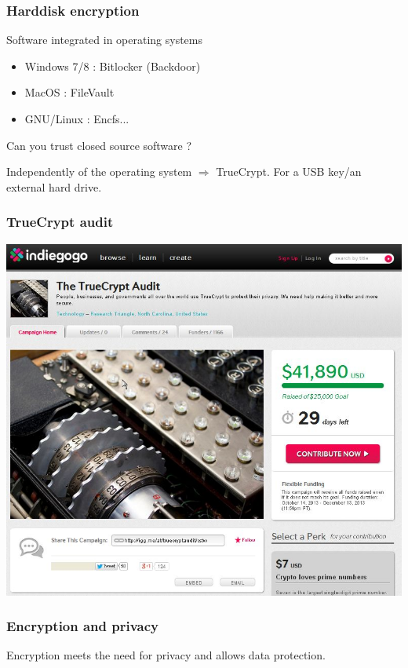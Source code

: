 \begin{frame}

\frametitle{Harddisk encryption}
\begin{block}{Software integrated in operating systems}
\begin{itemize}
\item Windows 7/8 : Bitlocker (Backdoor)
\item MacOS : FileVault
\item GNU/Linux : Encfs...
\end{itemize}
Can you trust closed source software ?
\end{block}

\begin{block}{Independently of the operating system}
$\Rightarrow$ TrueCrypt. For a USB key/an external hard drive.
\end{block}
\end{frame}

\begin{frame}
\frametitle{TrueCrypt audit}
\begin{center}
\includegraphics[scale=0.45] {./materials/truecryptaudit.jpg} 
\end{center}
\end{frame}

\begin{frame}
\frametitle{Encryption and privacy}
\begin{center}
\huge{Encryption meets the need for privacy and allows data protection.}
\end{center}
\end{frame}
